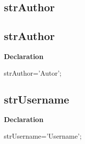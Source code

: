 \documentclass{report}
\newif\ifpdf
\begin{document}
\subsection*{\large{\textbf{strAuthor}}\normalsize\hspace{1ex}\hrulefill}
\else
\subsection*{strAuthor}
\fi
\label{trstrings-strAuthor}
\begin{list}{}{
\setlength{\itemindent}{0cm}
\setlength{\listparindent}{0cm}
\setlength{\leftmargin}{\evensidemargin}
\addtolength{\leftmargin}{\tmplength}
\settowidth{\labelsep}{X}
\addtolength{\leftmargin}{\labelsep}
\setlength{\labelwidth}{\tmplength}
}
\item[\textbf{Declaration}\hfill]
\ifpdf
\begin{flushleft}
\fi
\begin{ttfamily}
strAuthor='Autor';\end{ttfamily}

\ifpdf
\end{flushleft}
\fi

\end{list}
\ifpdf
\subsection*{\large{\textbf{strUsername}}\normalsize\hspace{1ex}\hrulefill}
\else
\subsection*{strUsername}
\fi
\label{trstrings-strUsername}
\begin{list}{}{
\setlength{\itemindent}{0cm}
\setlength{\listparindent}{0cm}
\setlength{\leftmargin}{\evensidemargin}
\addtolength{\leftmargin}{\tmplength}
\settowidth{\labelsep}{X}
\addtolength{\leftmargin}{\labelsep}
\setlength{\labelwidth}{\tmplength}
}
\item[\textbf{Declaration}\hfill]
\ifpdf
\begin{flushleft}
\fi
\begin{ttfamily}
strUsername='Username';\end{ttfamily}

\ifpdf
\end{flushleft}
\fi

\end{list}
\ifpdf
\end{document}
